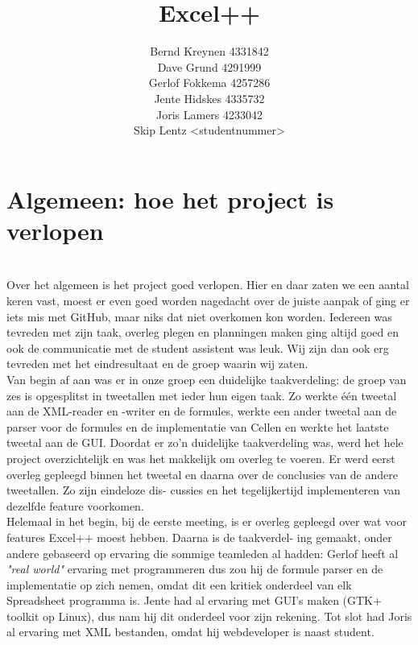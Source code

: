 \documentclass[a4paper,11pt]{article}
\title{Excel++}
\author{Bernd Kreynen 4331842\\
		Dave Grund 4291999\\
		Gerlof Fokkema 4257286\\
		Jente Hidskes 4335732\\
		Joris Lamers 4233042\\
		Skip Lentz <studentnummer>\\
	   }
\begin{document}
\begin{titlepage}
\maketitle
\thispagestyle{empty} %
\end{titlepage}

\newpage\section{Algemeen: hoe het project is verlopen}\mbox{} \\
Over het algemeen is het project goed verlopen. Hier en daar zaten we
een aantal keren vast, moest er even goed worden nagedacht over de juiste
aanpak of ging er iets mis met GitHub, maar niks dat niet overkomen kon
worden. Iedereen was tevreden met zijn taak, overleg plegen en planningen
maken ging altijd goed en ook de communicatie met de student assistent
was leuk. Wij zijn dan ook erg tevreden met het eindresultaat en de groep
waarin wij zaten.\\

Van begin af aan was er in onze groep een duidelijke taakverdeling: de
groep van zes is opgesplitst in tweetallen met ieder hun eigen taak. Zo
werkte één tweetal aan de XML-reader en -writer en de formules, werkte
een ander tweetal aan de parser voor de formules en de implementatie van
Cellen en werkte het laatste tweetal aan de GUI. Doordat er zo’n duidelijke
taakverdeling was, werd het hele project overzichtelijk en was het makkelijk
om overleg te voeren. Er werd eerst overleg gepleegd binnen het tweetal en
daarna over de conclusies van de andere tweetallen. Zo zijn eindeloze dis-
cussies en het tegelijkertijd implementeren van dezelfde feature voorkomen.\\

Helemaal in het begin, bij de eerste meeting, is er overleg gepleegd
over wat voor features Excel++ moest hebben. Daarna is de taakverdel-
ing gemaakt, onder andere gebaseerd op ervaring die sommige teamleden al
hadden: Gerlof heeft al \textit{"real world"} ervaring met programmeren dus zou
hij de formule parser en de implementatie op zich nemen, omdat dit een
kritiek onderdeel van elk Spreadsheet programma is. Jente had al ervaring
met GUI’s maken (GTK+ toolkit op Linux), dus nam hij dit onderdeel voor
zijn rekening. Tot slot had Joris al ervaring met XML bestanden, omdat hij
webdeveloper is naast student.\\
\end{document}
